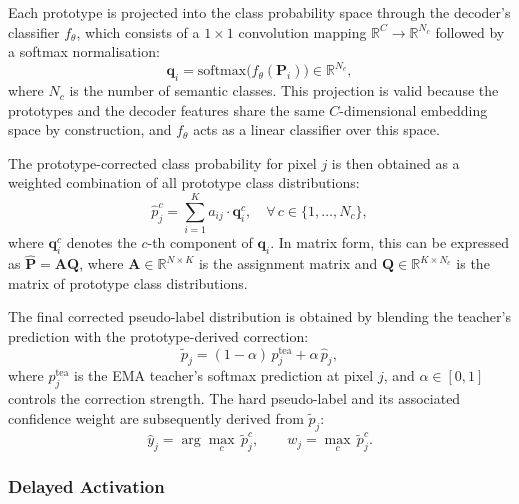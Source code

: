 Each prototype is projected into the class probability space through the decoder's classifier $f_\theta$, which consists of a $1 \times 1$ convolution mapping $\mathbb{R}^C \to \mathbb{R}^{N_c}$ followed by a softmax normalisation:
\begin{equation}
    \mathbf{q}_i = \text{softmax}\bigl(f_\theta(\mathbf{P}_i)\bigr) \in \mathbb{R}^{N_c},
    \label{eq:proto_projection}
\end{equation}
where $N_c$ is the number of semantic classes. This projection is valid because the prototypes and the decoder features share the same $C$-dimensional embedding space by construction, and $f_\theta$ acts as a linear classifier over this space.

The prototype-corrected class probability for pixel $j$ is then obtained as a weighted combination of all prototype class distributions:
\begin{equation}
    \hat{p}_j^{c} = \sum_{i=1}^{K} a_{ij} \cdot \mathbf{q}_i^{c}, \quad \forall \, c \in \{1, \ldots, N_c\},
    \label{eq:corrected_prob}
\end{equation}
where $\mathbf{q}_i^{c}$ denotes the $c$-th component of $\mathbf{q}_i$. In matrix form, this can be expressed as $\hat{\mathbf{P}} = \mathbf{A} \mathbf{Q}$, where $\mathbf{A} \in \mathbb{R}^{N \times K}$ is the assignment matrix and $\mathbf{Q} \in \mathbb{R}^{K \times N_c}$ is the matrix of prototype class distributions.

The final corrected pseudo-label distribution is obtained by blending the teacher's prediction with the prototype-derived correction:
\begin{equation}
    \tilde{p}_j = (1 - \alpha)\, p_j^{\text{tea}} + \alpha\, \hat{p}_j,
    \label{eq:blending}
\end{equation}
where $p_j^{\text{tea}}$ is the EMA teacher's softmax prediction at pixel $j$, and $\alpha \in [0, 1]$ controls the correction strength. The hard pseudo-label and its associated confidence weight are subsequently derived from $\tilde{p}_j$:
\begin{equation}
    \hat{y}_j = \arg\max_c \, \tilde{p}_j^{c}, \qquad
    w_j = \max_c \, \tilde{p}_j^{c}.
    \label{eq:hard_pseudo}
\end{equation}

\subsubsection{Delayed Activation}

